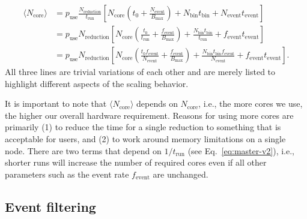 \documentclass[a4paper,english,numbers=noenddot,bibliography=totoc,chapterprefix=on,DIV=12]{scrartcl}
\newcommand{\Trun}{t_{\text{run}}}
\newcommand{\Tbin}{t_{\text{bin}}}
\newcommand{\Tevent}{t_{\text{event}}}
\newcommand{\Nbin}{N_{\text{bin}}}
\newcommand{\Ncore}{N_{\text{core}}}
\newcommand{\Ncoremean}{\langle N_{\text{core}}\rangle}
\newcommand{\Nevent}{N_{\text{event}}}
\newcommand{\Nreduction}{N_{\text{reduction}}}
\newcommand{\Bmax}{B_{\text{max}}}
\newcommand{\Fevent}{f_{\text{event}}}
\begin{document}
\begin{align}
  \Ncoremean &= p_{\text{use}}\frac{\Nreduction}{\Trun}\left[\Ncore \left(t_0 + \frac{\Nevent}{\Bmax}\right) + \Nbin\Tbin + \Nevent\Tevent\right]\\
  \label{eq:master-v2}
   &= p_{\text{use}}\Nreduction\left[\Ncore \left(\frac{t_0}{\Trun} + \frac{\Fevent}{\Bmax}\right) + \frac{\Nbin\Tbin}{\Trun} + \Fevent\Tevent\right]\\
   &= p_{\text{use}}\Nreduction\left[\Ncore \left(\frac{t_0\Fevent}{\Nevent} + \frac{\Fevent}{\Bmax}\right) + \frac{\Nbin\Tbin\Fevent}{\Nevent} + \Fevent\Tevent\right].
\end{align}
All three lines are trivial variations of each other and are merely listed to highlight different aspects of the scaling behavior.

It is important to note that $\Ncoremean$ depends on $\Ncore$, i.e., the more cores we use, the higher our overall hardware requirement.
Reasons for using more cores are primarily (1) to reduce the time for a single reduction to something that is acceptable for users, and (2) to work around memory limitations on a single node.
There are two terms that depend on $1/\Trun$ (see Eq.~\eqref{eq:master-v2}), i.e., shorter runs will increase the number of required cores even if all other parameters such as the event rate $\Fevent$ are unchanged.

%


\subsection{Event filtering}
\end{document}
